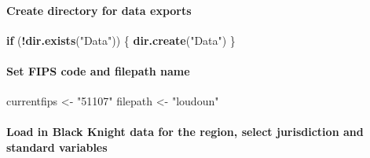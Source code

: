 \documentclass[]{article}
\newenvironment{Shaded}{\begin{snugshade}}{\end{snugshade}}
\newcommand{\KeywordTok}[1]{\textcolor[rgb]{0.13,0.29,0.53}{\textbf{#1}}}
\newcommand{\DataTypeTok}[1]{\textcolor[rgb]{0.13,0.29,0.53}{#1}}
\newcommand{\StringTok}[1]{\textcolor[rgb]{0.31,0.60,0.02}{#1}}
\newcommand{\ControlFlowTok}[1]{\textcolor[rgb]{0.13,0.29,0.53}{\textbf{#1}}}
\newcommand{\OperatorTok}[1]{\textcolor[rgb]{0.81,0.36,0.00}{\textbf{#1}}}
\newcommand{\NormalTok}[1]{#1}
\let\oldparagraph\paragraph
\renewcommand{\paragraph}[1]{\oldparagraph{#1}\mbox{}}
\begin{document}
\paragraph{Create directory for data
exports}\label{create-directory-for-data-exports}

\begin{Shaded}
\begin{Highlighting}[]
\ControlFlowTok{if}\NormalTok{ (}\OperatorTok{!}\KeywordTok{dir.exists}\NormalTok{(}\StringTok{"Data"}\NormalTok{)) \{}
  \KeywordTok{dir.create}\NormalTok{(}\StringTok{"Data"}\NormalTok{)}
\NormalTok{\}}
\end{Highlighting}
\end{Shaded}

\paragraph{Set FIPS code and filepath
name}\label{set-fips-code-and-filepath-name}

\begin{Shaded}
\begin{Highlighting}[]
\NormalTok{currentfips <-}\StringTok{ "51107"}
\NormalTok{filepath <-}\StringTok{ "loudoun"}
\end{Highlighting}
\end{Shaded}

\paragraph{Load in Black Knight data for the region, select jurisdiction
and standard
variables}\label{load-in-black-knight-data-for-the-region-select-jurisdiction-and-standard-variables}

\begin{Shaded}
\end{Shaded}
\end{document}
